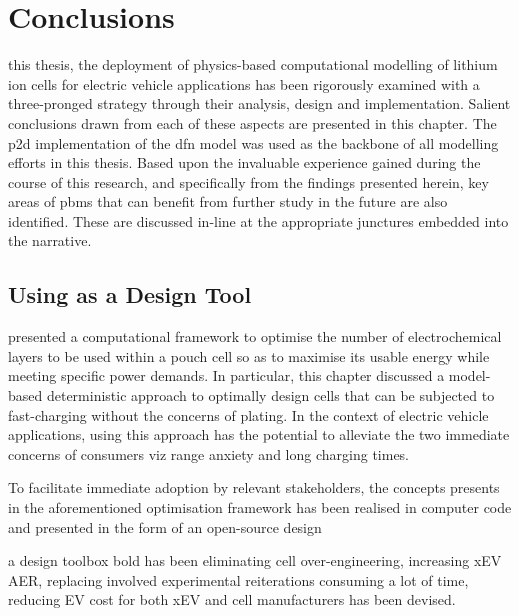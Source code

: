 
\graphicspath{{chapters/litt_review/figures/}}

\clearpage
\chapter{Conclusions}\label{ch:conclusions}
\startcontents[chapters]

\bigskip

 this  thesis, the  deployment of  physics-based computational
modelling  of lithium  ion  cells  for electric  vehicle  applications has  been
rigorously examined with a three-pronged strategy \viz{} through their analysis,
design and implementation. Salient conclusions  drawn from each of these aspects
are presented  in this  chapter. The \gls{p2d}  implementation of  the \gls{dfn}
model was used  as the backbone of  all modelling efforts in  this thesis. Based
upon the  invaluable experience gained during  the course of this  research, and
specifically from the  findings presented herein, key areas  of \glspl{pbm} that
can benefit  from further  study in  the future are  also identified.  These are
discussed in-line at the appropriate junctures embedded into the narrative.

\section{Using  as a Design Tool}

 presented  a computational framework to  optimise the
number  of electrochemical  layers to  be  used within  a  pouch cell  so as  to
maximise its usable energy while  meeting specific power demands. In particular,
this chapter discussed a model-based  deterministic approach to optimally design
cells that can be subjected to fast-charging without the concerns of plating. In
the  context of  electric  vehicle  applications, using  this  approach has  the
potential  to alleviate  the two  immediate  concerns of  consumers viz{}  range
anxiety and long charging times.

To facilitate immediate adoption by relevant stakeholders, the concepts presents
in the aforementioned optimisation framework has been realised in computer code
and presented in the form of an open-source design

a design toolbox  \viz{}
\gls{bold} has been  eliminating  cell  over-engineering,  increasing  xEV  AER,  replacing  involved
experimental reiterations consuming a lot of time, reducing EV cost for both xEV
and cell manufacturers has been devised.

